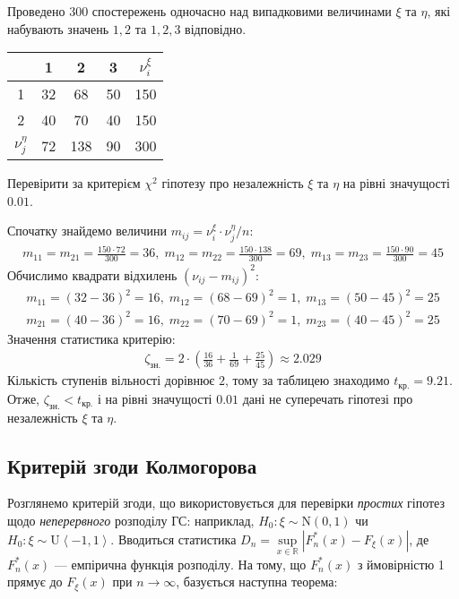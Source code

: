 \begin{example}
    Проведено 300 спостережень одночасно над випадковими величинами $\xi$ та $\eta$, які набувають значень $1, 2$ та $1, 2, 3$ відповідно.
    \begin{center}
        \begin{tabular}{|c|c|c|c|c|}
            \hline
            \diagbox{$\xi$}{$\eta$} & 1 & 2 & 3 & $\nu_i^{\xi}$ \\
            \hline
            1 & 32 & 68 & 50 & 150 \\
            \hline
            2 & 40 & 70 & 40 & 150\\
            \hline
            $\nu_j^{\eta}$ & 72 & 138 & 90 & 300\\
            \hline
        \end{tabular}
    \end{center}
    Перевірити за критерієм $\chi^2$ гіпотезу про незалежність $\xi$ та $\eta$ на рівні значущості $0.01$.

    Спочатку знайдемо величини $m_{ij} = \nu_i^\xi\cdot \nu_j^\eta / n$:
    \begin{gather*}
        m_{1 1} = m_{2 1} = \frac{150 \cdot 72}{300} = 36, \; m_{1 2} = m_{2 2} = \frac{150 \cdot 138}{300} = 69, \;
        m_{1 3} = m_{2 3} = \frac{150 \cdot 90}{300} = 45
    \end{gather*}
    Обчислимо квадрати відхилень $\left(\nu_{ij} - m_{ij}\right)^2$:
    \begin{gather*}
        m_{1 1} = (32 - 36)^2 = 16, \; m_{1 2} = (68 - 69)^2 = 1, \; m_{1 3} = (50 - 45)^2 = 25 \\
        m_{2 1} = (40 - 36)^2 = 16, \; m_{2 2} = (70 - 69)^2 = 1, \; m_{2 3} = (40 - 45)^2 = 25
    \end{gather*}
    Значення статистика критерію:
    \begin{gather*}
        \zeta_{\text{зн.}} = 2\cdot \left(\frac{16}{36} + \frac{1}{69} + \frac{25}{45}\right) \approx 2.029
    \end{gather*}
    Кількість ступенів вільності дорівнює $2$, тому за таблицею знаходимо $t_{\text{кр.}} = 9.21$. Отже,
    $\zeta_{\text{зн.}} < t_{\text{кр.}}$ і на рівні значущості $0.01$ дані не суперечать гіпотезі про незалежність $\xi$ та $\eta$.
\end{example}

\subsection{Критерій згоди Колмогорова}
Розглянемо критерій згоди, що використовується для перевірки \emph{простих} гіпотез щодо \emph{неперервного} розподілу ГС: наприклад,
$H_0 : \xi \sim \mathrm{N}(0, 1)$ чи $H_0 : \xi \sim \mathrm{U}\left<-1, 1\right>$.
Вводиться статистика $D_n = \underset{x \in \mathbb{R}}{\sup} \left| F_n^*(x) - F_\xi(x)\right|$, де $F_n^*(x)$ --- емпірична функція розподілу.
На тому, що $F_n^*(x)$ з ймовірністю 1 прямує до $F_\xi(x)$ при $n\to\infty$, базується наступна теорема:

